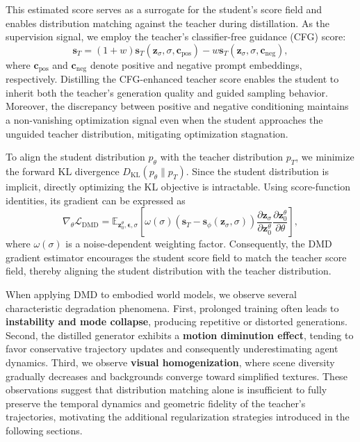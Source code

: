 \documentclass{llmxive}
\begin{document}
This estimated score serves as a surrogate for the student's score field and enables distribution matching against the teacher during distillation. As the supervision signal, we employ the teacher's classifier-free guidance (CFG) score:
\begin{equation}
\mathbf{s}_T
=
(1+w)\mathbf{s}_T(\mathbf{z}_\sigma,\sigma,\mathbf{c}_{\mathrm{pos}})
-
w\mathbf{s}_T(\mathbf{z}_\sigma,\sigma,\mathbf{c}_{\mathrm{neg}}),
\end{equation}
where $\mathbf{c}_{\mathrm{pos}}$ and $\mathbf{c}_{\mathrm{neg}}$ denote positive and negative prompt embeddings, respectively. Distilling the CFG-enhanced teacher score enables the student to inherit both the teacher's generation quality and guided sampling behavior. Moreover, the discrepancy between positive and negative conditioning maintains a non-vanishing optimization signal even when the student approaches the unguided teacher distribution, mitigating optimization stagnation.

To align the student distribution $p_\theta$ with the teacher distribution $p_T$, we minimize the forward KL divergence $D_{\mathrm{KL}}(p_\theta \| p_T)$. Since the student distribution is implicit, directly optimizing the KL objective is intractable. Using score-function identities, its gradient can be expressed as
\begin{equation}
\nabla_\theta \mathcal{L}_{\mathrm{DMD}}
=
\mathbb{E}_{\mathbf{z}_0^\theta,\boldsymbol{\epsilon},\sigma}
\left[
\omega(\sigma)
\left(
\mathbf{s}_T
-
\mathbf{s}_\phi(\mathbf{z}_\sigma,\sigma)
\right)
\frac{\partial \mathbf{z}_\sigma}{\partial \mathbf{z}_0^\theta}
\frac{\partial \mathbf{z}_0^\theta}{\partial \theta}
\right],
\end{equation}
where $\omega(\sigma)$ is a noise-dependent weighting factor. Consequently, the DMD gradient estimator encourages the student score field to match the teacher score field, thereby aligning the student distribution with the teacher distribution.

When applying DMD to embodied world models, we observe several characteristic degradation phenomena. First, prolonged training often leads to \textbf{instability and mode collapse}, producing repetitive or distorted generations. Second, the distilled generator exhibits a \textbf{motion diminution effect}, tending to favor conservative trajectory updates and consequently underestimating agent dynamics. Third, we observe \textbf{visual homogenization}, where scene diversity gradually decreases and backgrounds converge toward simplified textures. These observations suggest that distribution matching alone is insufficient to fully preserve the temporal dynamics and geometric fidelity of the teacher's trajectories, motivating the additional regularization strategies introduced in the following sections.
\end{document}
